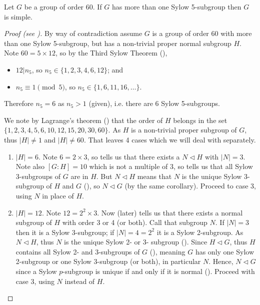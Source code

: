 \begin{theorem}\label{thrm-group-of-order-60-with->1-sylow-5-subgroup-is-simple}
    Let $G$ be a group of order 60. If $G$ has more than one Sylow 5-subgroup then $G$ is simple.
\end{theorem}
\begin{proof}[Proof (see {\cite[Proposition 4.21]{dummit_foote_2004}})]
    By way of contradiction assume $G$ is a group of order 60 with more than one Sylow 5-subgroup, but has a non-trivial proper normal subgroup $H$. Note $60 = 5 \times 12$, so by the Third Sylow Theorem (),
    \begin{itemize}
        \item $12 \vert n_5$, so $n_5 \in \{1, 2, 3, 4, 6, 12\}$; and
        \item $n_5 \equiv 1 \pmod 5$, so $n_5 \in \{1, 6, 11, 16, \dots\}$.
    \end{itemize}
    Therefore $n_5 = 6$ as $n_5 > 1$ (given), i.e. there are 6 Sylow 5-subgroups.

    We note by Lagrange's theorem () that the order of $H$ belongs in the set $\{1, 2, 3, 4, 5, 6, 10, 12, 15, 20, 30, 60\}$. As $H$ is a non-trivial proper subgroup of $G$, thus $|H| \neq 1$ and $|H| \neq 60$. That leaves 4 cases which we will deal with separately.
    \begin{enumerate}
        \item $|H| = 6$. Note $6 = 2 \times 3$, so  tells us that there exists a $N \lhd H$ with $|N| = 3$. Note also $[G:H] = 10$ which is not a multiple of 3, so  tells us that all Sylow 3-subgroups of $G$ are in $H$. But $N \lhd H$ means that $N$ is the unique Sylow 3-subgroup of $H$ and $G$ (), so $N \lhd G$ (by the same corollary). Proceed to case 3, using $N$ in place of $H$.

        \item $|H| = 12$. Note $12 = 2^2 \times 3$. Now  (later) tells us that there exists a normal subgroup of $H$ with order 3 or 4 (or both). Call that subgroup $N$. If $|N| = 3$ then it is a Sylow 3-subgroup; if $|N| = 4 = 2^2$ it is a Sylow 2-subgroup. As $N \lhd H$, thus $N$ is the unique Sylow 2- or 3- subgroup (). Since $H \lhd G$, thus $H$ contains all Sylow 2- and 3-subgroups of $G$ (), meaning $G$ has only one Sylow 2-subgroup or one Sylow 3-subgroup (or both), in particular $N$. Hence, $N \lhd G$ since a Sylow $p$-subgroup is unique if and only if it is normal (). Proceed with case 3, using $N$ instead of $H$.


\end{enumerate}
\end{proof}
